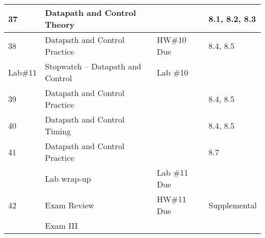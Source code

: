 \begin{longtable}{|l|m{7cm}|l|l|}
37 			& Datapath and Control Theory & & 8.1, 8.2, 8.3 \\ \hline
38 			& Datapath and Control Practice & HW\#10 Due & 8.4, 8.5 \\ \hline
 \rowcolor{yellow} 
Lab\#11	& Stopwatch -- Datapath and Control & Lab \#10 & \\ \hline
39			& Datapath and Control Practice & & 8.4, 8.5 \\ \hline
40			& Datapath and Control Timing & & 8.4, 8.5 \\ \hline
41			& Datapath and Control Practice & & 8.7 \\ \hline
 \rowcolor{yellow} 
			& Lab wrap-up & Lab \#11 Due & \\ \hline
42			& Exam Review & HW\#11 Due & Supplemental \\ \hline
			& Exam III & & \\ \hline
\end{longtable}
